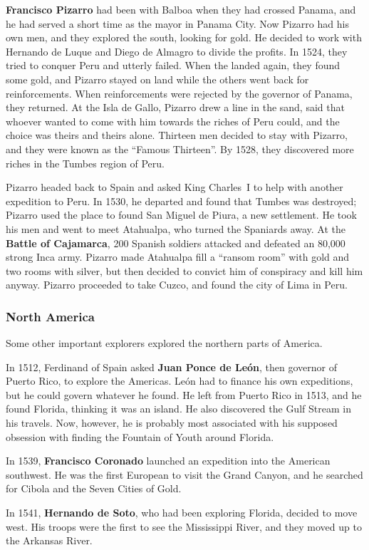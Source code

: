 \textbf{Francisco Pizarro} had been with Balboa when they had crossed Panama,
and he had served a short time as the mayor in Panama City.
Now Pizarro had his own men, and they explored the south, looking for gold.
He decided to work with Hernando de Luque and Diego de Almagro to divide the profits.
In 1524, they tried to conquer Peru and utterly failed.
When the landed again, they found some gold,
and Pizarro stayed on land while the others went back for reinforcements.
When reinforcements were rejected by the governor of Panama, they returned.
At the Isla de Gallo, Pizarro drew a line in the sand,
said that whoever wanted to come with him towards the riches of Peru could,
and the choice was theirs and theirs alone.
Thirteen men decided to stay with Pizarro, and they were known as the ``Famous Thirteen''.
By 1528, they discovered more riches in the Tumbes region of Peru.

Pizarro headed back to Spain and asked King Charles~I to help with another expedition to Peru.
In 1530, he departed and found that Tumbes was destroyed;
Pizarro used the place to found San Miguel de Piura, a new settlement.
He took his men and went to meet Atahualpa, who turned the Spaniards away.
At the \textbf{Battle of Cajamarca}, 200 Spanish soldiers attacked and defeated an 80,000 strong Inca army.
Pizarro made Atahualpa fill a ``ransom room'' with gold and two rooms with silver,
but then decided to convict him of conspiracy and kill him anyway.
Pizarro proceeded to take Cuzco, and found the city of Lima in Peru.

\subsubsection*{North America}

Some other important explorers explored the northern parts of America.

In 1512, Ferdinand of Spain asked \textbf{Juan Ponce de Le\'on},
then governor of Puerto Rico, to explore the Americas.
Le\'on had to finance his own expeditions, but he could govern whatever he found.
He left from Puerto Rico in 1513, and he found Florida, thinking it was an island.
He also discovered the Gulf Stream in his travels.
Now, however, he is probably most associated with his supposed obsession
with finding the Fountain of Youth around Florida.

In 1539, \textbf{Francisco Coronado} launched an expedition into the American southwest.
He was the first European to visit the Grand Canyon,
and he searched for Cibola and the Seven Cities of Gold.

In 1541, \textbf{Hernando de Soto}, who had been exploring Florida, decided to move west.
His troops were the first to see the Mississippi River, and they moved up to the Arkansas River.

